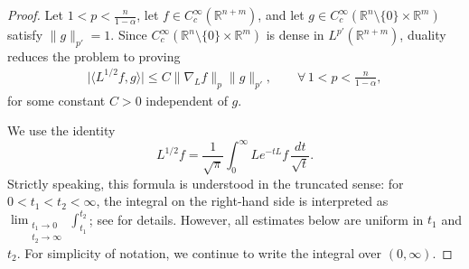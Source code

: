 \documentclass[12pt]{amsart}
\begin{document}
\begin{proof}
Let $1<p<\frac{n}{1-\alpha}$, let $f\in C_c^\infty(\mathbb{R}^{n+m})$, and let $g\in C_c^\infty(\mathbb{R}^{n}\setminus \{0\} \times \mathbb{R}^m)$ satisfy $\|g\|_{p'}=1$. Since $C_c^\infty(\mathbb{R}^{n}\setminus \{0\} \times \mathbb{R}^m)$ is dense in $L^{p'}(\mathbb{R}^{n+m})$, duality reduces the problem to proving
\begin{align*}
    \bigl| \langle L^{1/2}f, g \rangle \bigr| \le C \|\nabla_L f\|_p \|g\|_{p'},\qquad \forall\, 1<p<\frac{n}{1-\alpha},
\end{align*}
for some constant $C>0$ independent of $g$.

We use the identity
\begin{equation*}
    L^{1/2}f
    =
    \frac{1}{\sqrt{\pi}}
    \int_0^\infty
    Le^{-tL}f\,\frac{dt}{\sqrt t}.
\end{equation*}
Strictly speaking, this formula is understood in the truncated sense: for
$0<t_1<t_2<\infty$, the integral on the right-hand side is interpreted as
$\lim_{\substack{t_1\to 0\\ t_2 \to \infty}} \int_{t_1}^{t_2}$; see \cite{AC} for details. However, all estimates below are uniform in $t_1$ and $t_2$. For simplicity of notation, we continue to write the integral over $(0,\infty)$.


\end{proof}
\end{document}
